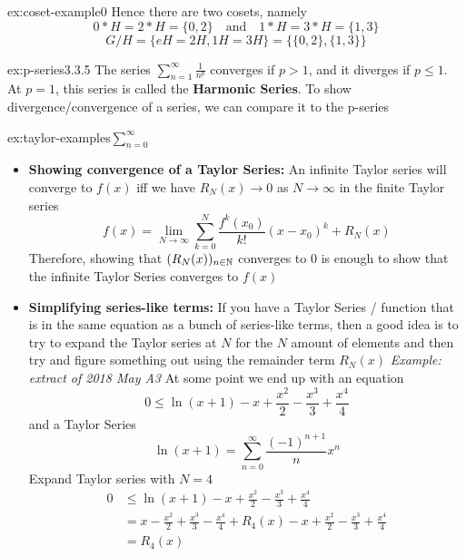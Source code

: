\documentclass[landscape, 8pt]{extarticle}
\begin{document}
\begin{multicols}{3}
\begin{xmp}{ex:coset-example}{0}
    Hence there are two cosets, namely
    \[0 * H=2 * H=\{0,2\} \quad\text{and}\quad 1 * H=3 * H=\{1,3\}\]
    \[G/H=\{eH=2H,1H=3H\} = \{\{0,2\}, \{1,3\}\}\]
\end{xmp}
\vspace{-5pt}

\begin{xmp}[p-series]{ex:p-series}{3.3.5}
The series $\displaystyle\sum_{n=1}^{\infty} \frac{1}{n^{p}}$ converges if $p > 1$, and it diverges if $p \le 1$. At $p = 1$, this series is called the \textbf{Harmonic Series}.
\vspace{0pt}\newline
To show divergence/convergence of a series, we can compare it to the p-series

\end{xmp}
\vspace{-5pt}

\begin{xmp}{ex:taylor-examples}{$\sum^{\infty}_{n=0}$}
    \renewcommand\labelitemi{\tiny$\bullet$}
    \begin{itemize}
        \setlength\itemsep{0em}
        \item \textbf{Showing convergence of a Taylor Series:} An infinite Taylor series will converge to $f(x)$ iff we have $R_{N}(x) \to 0$ as $N\to\infty$ in the finite Taylor series
        \[\displaystyle f(x) = \lim_{N\to \infty} \sum_{k=0}^{N} \frac{f^k(x_{0})}{k!}(x-x_{0})^k + R_{N}(x)\]
        Therefore, showing that $(R_{N}(x))_{n\in \mathbb{N}}$ converges to $0$ is enough to show that the infinite Taylor Series converges to $f(x)$
        \item \textbf{Simplifying series-like terms:} If you have a Taylor Series / function that is in the same equation as a bunch of series-like terms, then a good idea is to try to expand the Taylor series at $N$ for the $N$ amount of elements and then try and figure something out using the remainder term $R_{N}(x)$
        \vspace{0pt}\newline
        \textit{Example: extract of 2018 May A3}
        \vspace{0pt}\newline
        At some point we end up with an equation
        \[0\le \ln(x + 1) - x + \frac{x^{2}}{2} - \frac{x^{3}}{3} + \frac{x^{4}}{4}\]
        and a Taylor Series
        \[\ln(x+1) = \sum_{n=0}^{\infty} \frac{(-1)^{n+1}}{n}x^n\]
        Expand Taylor series with $N=4$
        \[\begin{aligned}
            0&\le \ln(x + 1) - x + \frac{x^{2}}{2} - \frac{x^{3}}{3} + \frac{x^{4}}{4}\\
            &= x - \frac{x^{2}}{2} + \frac{x^{3}}{3} - \frac{x^{4}}{4} + R_{4}(x) - x + \frac{x^{2}}{2} - \frac{x^{3}}{3} + \frac{x^{4}}{4}\\
            &= R_{4}(x)
        \end{aligned}\]
    \end{itemize}
    \end{xmp}
    \vspace{-5pt}


\end{multicols}
\end{document}
